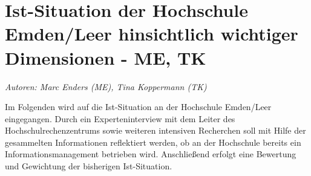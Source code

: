 \chapter{Ist-Situation der Hochschule Emden/Leer hinsichtlich wichtiger Dimensionen - ME, TK}
\textit{Autoren: Marc Enders (ME), Tina Koppermann (TK)}

Im Folgenden wird auf die Ist-Situation an der Hochschule Emden/Leer eingegangen. Durch ein 
Experteninterview mit dem Leiter des Hochschulrechenzentrums sowie weiteren intensiven Recherchen soll 
mit Hilfe der gesammelten Informationen reflektiert werden, ob an der Hochschule bereits ein 
Informationsmanagement betrieben wird. Anschließend erfolgt eine Bewertung und Gewichtung der 
bisherigen Ist-Situation.








